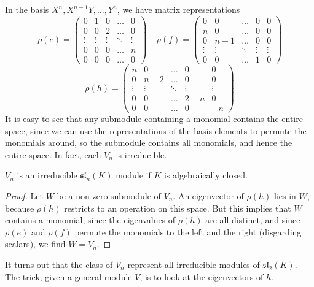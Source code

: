 %
In the basis $X^n,X^{n-1}Y, \dots, Y^n$, we have matrix representations
%
\[ \rho(e) = \begin{pmatrix} 0 & 1 & 0 & \dots & 0 \\ 0 & 0 & 2 & \dots & 0 \\ \vdots & \vdots & \vdots & \ddots & \vdots \\ 0 & 0 & 0 & \dots & n \\ 0 & 0 & 0 & \dots & 0 \end{pmatrix}\ \ \ \ \ \rho(f) = \begin{pmatrix} 0 & 0 & \dots & 0 & 0 \\ n & 0 & \dots & 0 & 0 \\ 0 & n-1 & \dots & 0 & 0 \\ \vdots & \vdots & \ddots & \vdots & \vdots \\ 0 & 0 & \dots & 1 & 0 \end{pmatrix} \]
\[ \rho(h) = \begin{pmatrix} n & 0 & \dots & 0 & 0 \\ 0 & n-2 & \dots & 0 & 0 \\ \vdots & \vdots & \ddots & \vdots & \vdots \\ 0 & 0 & \dots & 2 - n & 0 \\ 0 & 0 & \dots & 0 & -n \end{pmatrix} \]
%
It is easy to see that any submodule containing a monomial contains the entire space, since we can use the representations of the basis elements to permute the monomials around, so the submodule contains all monomials, and hence the entire space. In fact, each $V_n$ is irreducible.

\begin{theorem}
    $V_n$ is an irreducible $\mathfrak{sl}_n(K)$ module if $K$ is algebraically closed.
\end{theorem}
\begin{proof}
    Let $W$ be a non-zero submodule of $V_n$. An eigenvector of $\rho(h)$ lies in $W$, because $\rho(h)$ restricts to an operation on this space. But this implies that $W$ contains a monomial, since the eigenvalues of $\rho(h)$ are all distinct, and since $\rho(e)$ and $\rho(f)$ permute the monomials to the left and the right (disgarding scalars), we find $W = V_n$.
\end{proof}

It turns out that the class of $V_n$ represent all irreducible modules of $\mathfrak{sl}_2(K)$. The trick, given a general module $V$, is to look at the eigenvectors of $h$.

